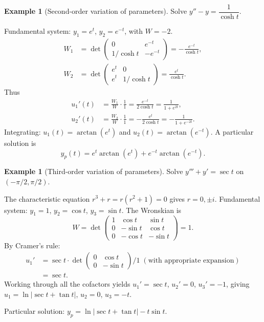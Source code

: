 \documentclass[12pt,a4paper,openany]{book}
\theoremstyle{definition}
\newtheorem{example}[definition]{Example}
\theoremstyle{plain}
\theoremstyle{remark}
\newcommand{\abs}[1]{\left|#1\right|}
\begin{document}
\begin{example}[Second-order variation of parameters]\label{ex:var-params-2}
Solve $y'' - y = \dfrac{1}{\cosh t}$.

Fundamental system: $y_1=e^t$, $y_2=e^{-t}$, with $W=-2$.
\begin{align*}
  W_1 &= \det\begin{pmatrix}0 & e^{-t}\\ 1/\cosh t & -e^{-t}\end{pmatrix}
       = -\frac{e^{-t}}{\cosh t}, \\
  W_2 &= \det\begin{pmatrix}e^t & 0\\ e^t & 1/\cosh t\end{pmatrix}
       = \frac{e^t}{\cosh t}.
\end{align*}
Thus
\begin{align*}
  u_1'(t) &= \frac{W_1}{W}\cdot\frac{1}{1} = \frac{e^{-t}}{2\cosh t}
           = \frac{1}{1+e^{2t}}, \\
  u_2'(t) &= \frac{W_2}{W}\cdot\frac{1}{1} = -\frac{e^t}{2\cosh t}
           = -\frac{1}{1+e^{-2t}}.
\end{align*}
Integrating: $u_1(t) = \arctan(e^t)$ and
$u_2(t) = \arctan(e^{-t})$.
A particular solution is
\[
  y_p(t) = e^t\arctan(e^t) + e^{-t}\arctan(e^{-t}).
\]
\end{example}

\begin{example}[Third-order variation of parameters]\label{ex:var-params-3}
Solve $y'''+y'=\sec t$ on $(-\pi/2,\pi/2)$.

The characteristic equation $r^3+r=r(r^2+1)=0$ gives $r=0,\pm i$.
Fundamental system: $y_1=1$, $y_2=\cos t$, $y_3=\sin t$.
The Wronskian is
\[
  W = \det\begin{pmatrix}
    1 & \cos t & \sin t \\
    0 & -\sin t & \cos t \\
    0 & -\cos t & -\sin t
  \end{pmatrix} = 1.
\]
By Cramer's rule:
\begin{align*}
  u_1' &= \sec t\cdot\det\begin{pmatrix}
    0 & \cos t \\ 0 & -\sin t
  \end{pmatrix}\Big/1 \;(\text{with appropriate expansion})\\
  &= \sec t.
\end{align*}
Working through all the cofactors yields
$u_1'=\sec t$, $u_2'=0$, $u_3'=-1$, giving
$u_1=\ln\abs{\sec t+\tan t}$, $u_2=0$, $u_3=-t$.

Particular solution: $y_p = \ln\abs{\sec t+\tan t} - t\sin t$.
\end{example}
\end{document}
